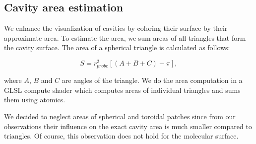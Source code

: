 \subsection{Cavity area estimation}

We enhance the visualization of cavities by coloring their surface by their approximate area.
To estimate the area, we sum areas of all triangles that form the cavity surface.
The area of a spherical triangle is calculated as follows:

\begin{equation}
  S = r_{probe}^2 \left[ \left( A + B + C \right) - \pi \right],
\end{equation}

where $A$, $B$ and $C$ are angles of the triangle. We do the area computation in a GLSL compute shader which computes areas of individual triangles and sums them using atomics.

We decided to neglect areas of spherical and toroidal patches since from our observations their influence on the exact cavity area is much smaller compared to triangles.
Of course, this observation does not hold for the molecular surface.

